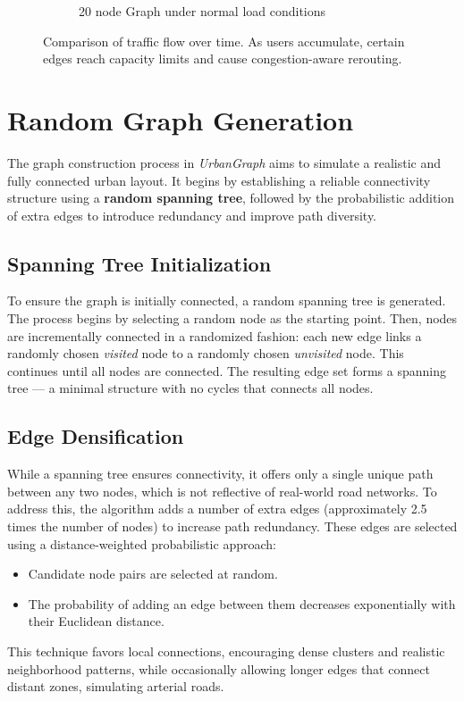 \documentclass[12pt]{article}
\begin{document}
\begin{figure}[H]
\begin{subfigure}[b]{0.48\textwidth}
        \caption{20 node Graph under normal load conditions}
        \label{fig:traffic-congested}
    \end{subfigure}
    \caption{Comparison of traffic flow over time. As users accumulate, certain edges reach capacity limits and cause congestion-aware rerouting.}
    \label{fig:traffic-comparison}
\end{figure}


\section{Random Graph Generation}

The graph construction process in \textit{UrbanGraph} aims to simulate a realistic and fully connected urban layout. It begins by establishing a reliable connectivity structure using a \textbf{random spanning tree}, followed by the probabilistic addition of extra edges to introduce redundancy and improve path diversity.

\subsection{Spanning Tree Initialization}

To ensure the graph is initially connected, a random spanning tree is generated. The process begins by selecting a random node as the starting point. Then, nodes are incrementally connected in a randomized fashion: each new edge links a randomly chosen \textit{visited} node to a randomly chosen \textit{unvisited} node. This continues until all nodes are connected. The resulting edge set forms a spanning tree — a minimal structure with no cycles that connects all nodes.

\subsection{Edge Densification}

While a spanning tree ensures connectivity, it offers only a single unique path between any two nodes, which is not reflective of real-world road networks. To address this, the algorithm adds a number of extra edges (approximately 2.5 times the number of nodes) to increase path redundancy. These edges are selected using a distance-weighted probabilistic approach:
\begin{itemize}
    \item Candidate node pairs are selected at random.
    \item The probability of adding an edge between them decreases exponentially with their Euclidean distance.
\end{itemize}
This technique favors local connections, encouraging dense clusters and realistic neighborhood patterns, while occasionally allowing longer edges that connect distant zones, simulating arterial roads.
\end{document}
